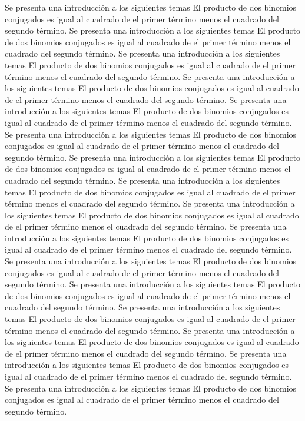 \documentclass[journal]{IEEEtran}
\begin{document}
Se presenta una introducción a los siguientes temas El producto de dos binomios conjugados es igual al cuadrado de el primer término menos el cuadrado del segundo término.
Se presenta una introducción a los siguientes temas El producto de dos binomios conjugados es igual al cuadrado de el primer término menos el cuadrado del segundo término.
Se presenta una introducción a los siguientes temas El producto de dos binomios conjugados es igual al cuadrado de el primer término menos el cuadrado del segundo término.
Se presenta una introducción a los siguientes temas El producto de dos binomios conjugados es igual al cuadrado de el primer término menos el cuadrado del segundo término.
Se presenta una introducción a los siguientes temas El producto de dos binomios conjugados es igual al cuadrado de el primer término menos el cuadrado del segundo término.
Se presenta una introducción a los siguientes temas El producto de dos binomios conjugados es igual al cuadrado de el primer término menos el cuadrado del segundo término.
Se presenta una introducción a los siguientes temas El producto de dos binomios conjugados es igual al cuadrado de el primer término menos el cuadrado del segundo término.
Se presenta una introducción a los siguientes temas El producto de dos binomios conjugados es igual al cuadrado de el primer término menos el cuadrado del segundo término.
Se presenta una introducción a los siguientes temas El producto de dos binomios conjugados es igual al cuadrado de el primer término menos el cuadrado del segundo término.
Se presenta una introducción a los siguientes temas El producto de dos binomios conjugados es igual al cuadrado de el primer término menos el cuadrado del segundo término.
Se presenta una introducción a los siguientes temas El producto de dos binomios conjugados es igual al cuadrado de el primer término menos el cuadrado del segundo término.
Se presenta una introducción a los siguientes temas El producto de dos binomios conjugados es igual al cuadrado de el primer término menos el cuadrado del segundo término.
Se presenta una introducción a los siguientes temas El producto de dos binomios conjugados es igual al cuadrado de el primer término menos el cuadrado del segundo término.
Se presenta una introducción a los siguientes temas El producto de dos binomios conjugados es igual al cuadrado de el primer término menos el cuadrado del segundo término.
Se presenta una introducción a los siguientes temas El producto de dos binomios conjugados es igual al cuadrado de el primer término menos el cuadrado del segundo término.
Se presenta una introducción a los siguientes temas El producto de dos binomios conjugados es igual al cuadrado de el primer término menos el cuadrado del segundo término.
\end{document}
